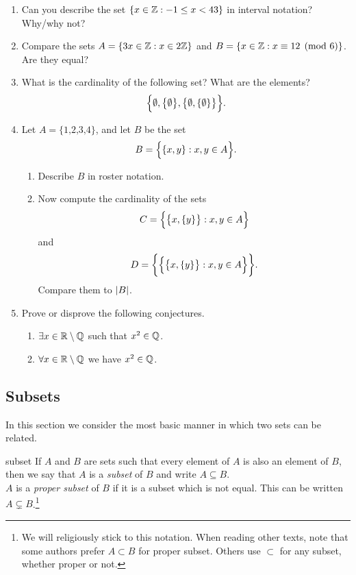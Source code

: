 \begin{exercises}{}{}
\begin{enumerate}
	\item Can you describe the set $\{x\in\mathbb{Z}:-1\le x<43\}$ in interval notation? Why/why not?
	
	\item Compare the sets $A=\{3x\in\mathbb{Z}:x\in 2\mathbb{Z}\}$ and $B=\{x\in\mathbb{Z}:x\equiv 12\pmod 6\}$. Are they equal?
		
	\item What is the cardinality of the following set? What are the elements?
	\[\Bigl\{\emptyset,\bigl\{\emptyset\bigr\},\bigl\{\emptyset,\{\emptyset\}\bigr\}\Bigr\}.\]
	
	\item Let $A=\{\text{1,2,3,4}\}$, and let $B$ be the set
	\[B=\Bigl\{\{x,y\}:x,y\in A\Bigr\}.\]
	\begin{enumerate}
	  \item Describe $B$ in roster notation.
		\item Now compute the cardinality of the sets
		\[C=\Bigl\{\bigl\{x,\{y\}\bigr\}:x,y\in A\Bigr\}\]
		and
		\[D=\biggl\{\Bigl\{\bigl\{x,\{y\}\bigr\}:x,y\in A\Bigr\}\biggr\}.\]
		Compare them to $\left| B\right|$.
	\end{enumerate}
		
  \item Prove or disprove the following conjectures.
  \begin{enumerate}
    \item $\exists x\in\mathbb{R}\setminus\mathbb{Q}$ such that $x^2\in\mathbb{Q}$.
    \item $\forall x\in\mathbb{R}\setminus\mathbb{Q}$ we have $x^2\in\mathbb{Q}$.
	\end{enumerate}
\end{enumerate}

\end{exercises}

\clearpage



\subsection{Subsets}

In this section we consider the most basic manner in which two sets can be related.

\begin{defn}{}{subset}
If $A$ and $B$ are sets such that every element of $A$ is also an element of $B$, then we say that $A$ is a \emph{subset} of $B$ and write $A\subseteq B$.\\
$A$ is a \emph{proper subset} of $B$ if it is a subset which is not equal. This can be written $A\subsetneq B$.\footnote{We will religiously stick to this notation. When reading other texts, note that some authors prefer $A\subset B$ for proper subset. Others use $\subset$ for any subset, whether proper or not.}
\end{defn}

